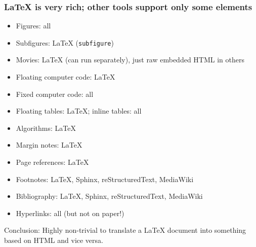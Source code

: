 \documentclass{beamer}
\begin{document}
\begin{frame}
\frametitle{{\LaTeX} is very rich; other tools support only some elements}

\begin{itemize}
\pause
 \item Figures: all

\pause
 \item Subfigures: {\LaTeX} (\texttt{subfigure})

\pause
 \item Movies: {\LaTeX} (can run separately), just raw embedded HTML in others

\pause
 \item Floating computer code: {\LaTeX}

\pause
 \item Fixed computer code: all

\pause
 \item Floating tables: {\LaTeX}; inline tables: all

\pause
 \item Algorithms: {\LaTeX}

\pause
 \item Margin notes: {\LaTeX}

\pause
 \item Page references: {\LaTeX}

\pause
 \item Footnotes: {\LaTeX}, Sphinx, reStructuredText, MediaWiki

\pause
 \item Bibliography: {\LaTeX}, Sphinx, reStructuredText, MediaWiki

\pause
 \item Hyperlinks: all (but not on paper!)
\end{itemize}

\noindent

\pause
Conclusion: Highly non-trivial to translate a {\LaTeX} document into something
based on HTML and vice versa.
\end{frame}
\end{document}

